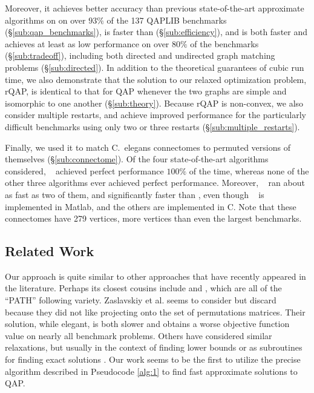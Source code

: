 \documentclass[preprint,11pt]{elsarticle}
\begin{document}
Moreover, it achieves better accuracy than previous state-of-the-art approximate algorithms on on over $93\%$ of the 137 QAPLIB benchmarks (\S \ref{sub:qap_benchmarks}), is faster than \Path (\S \ref{sub:efficiency}), and is both faster and achieves at least as low performance on over $80\%$ of the benchmarks (\S \ref{sub:tradeoff}),  including both directed and undirected graph matching problems (\S \ref{sub:directed}).  
In addition to the theoretical guarantees of cubic run time, we also demonstrate that the solution to our relaxed optimization problem, rQAP, is identical to that for QAP whenever the two graphs are simple and isomorphic to one another (\S \ref{sub:theory}).
Because rQAP is non-convex, we also consider multiple restarts, and achieve improved performance for the particularly difficult benchmarks using only two or three restarts (\S \ref{sub:multiple_restarts}).  

  
Finally, we used it to match C.~elegans connectomes to permuted versions of themselves (\S \ref{sub:connectome}). Of the four state-of-the-art algorithms considered, \FAQ~ achieved perfect performance $100\%$ of the time, whereas none of the other three algorithms ever achieved perfect performance.  Moreover, \FAQ~ ran about as fast as two of them, and significantly faster than \Path, even though \FAQ~ is implemented in Matlab, and the others are implemented in C.  Note that these connectomes have 279 vertices, more vertices than even the largest benchmarks. 



\subsection{Related Work}


Our approach is quite similar to other approaches that have recently appeared in the literature.  Perhaps its closest cousins include \cite{Zaslavskiy2009, Zaslavskiy2010} and \cite{Escolano2011}, which are all of the ``PATH'' following variety.  Zaslavskiy et al.    seems to consider but discard \FAQ~  \cite{Zaslavskiy2009} because they did not like projecting onto the set of permutations matrices.  Their solution, while elegant, is both slower and obtains a worse objective function value on nearly all benchmark problems.  Others have considered similar relaxations, but usually in the context of finding lower bounds  \cite{Anstreicher2001} or as subroutines for finding exact solutions \cite{Brixius2000}.  Our work seems to be the first to utilize the precise algorithm described in Pseudocode \ref{alg:1} to find fast approximate solutions to QAP.
\end{document}
